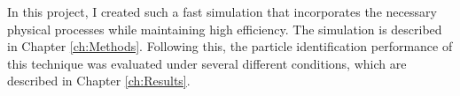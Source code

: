 In this project, I created such a fast simulation that incorporates the necessary physical processes while maintaining high efficiency.
The simulation is described in Chapter \ref{ch:Methods}.
Following this, the particle identification performance of this technique was evaluated under several different conditions, which are described in Chapter \ref{ch:Results}.

\endinput

Any text after an \endinput is ignored.
You could put scraps here or things in progress.
